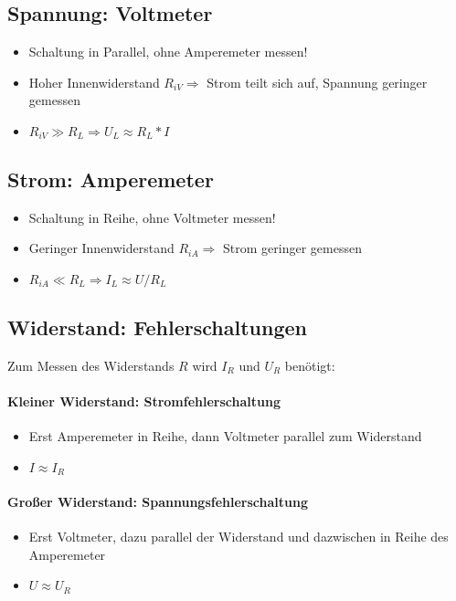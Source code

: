 \subsection{Spannung: Voltmeter}

\begin{itemize}
  \item Schaltung in Parallel, ohne Amperemeter messen!
  \item Hoher Innenwiderstand $R_{iV} \Rightarrow$ Strom teilt sich auf, Spannung geringer gemessen
  \item $R_{iV} \gg R_L \Rightarrow U_L \approx R_L * I$
\end{itemize}

\subsection{Strom: Amperemeter}

\begin{itemize}
  \item Schaltung in Reihe, ohne Voltmeter messen!
  \item Geringer Innenwiderstand $R_{iA} \Rightarrow$ Strom geringer gemessen
  \item $R_{iA} \ll R_L \Rightarrow I_L \approx U/R_L$
\end{itemize}

\subsection{Widerstand: Fehlerschaltungen}

Zum Messen des Widerstands $R$ wird $I_R$ und $U_R$ benötigt:

\paragraph{Kleiner Widerstand: Stromfehlerschaltung}

\begin{itemize}
  \item Erst Amperemeter in Reihe, dann Voltmeter parallel zum Widerstand
  \item $I \approx I_R$
\end{itemize}

\paragraph{Gro\ss er Widerstand: Spannungsfehlerschaltung}

\begin{itemize}
  \item Erst Voltmeter, dazu parallel der Widerstand und dazwischen in Reihe des Amperemeter
  \item $U \approx U_R$
\end{itemize}

